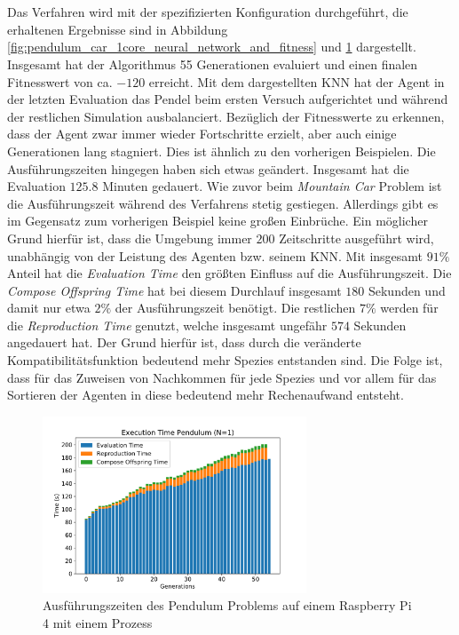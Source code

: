 \\\\
Das Verfahren wird mit der spezifizierten Konfiguration durchgeführt, die erhaltenen Ergebnisse sind in Abbildung \ref{fig:pendulum_car_1core_neural_network_and_fitness} und \ref{fig:pendulum_1core_1pi_time} dargestellt. Insgesamt hat der Algorithmus 55 Generationen evaluiert und einen finalen Fitnesswert von ca. $-120$ erreicht. Mit dem dargestellten \ac{KNN} hat der Agent in der letzten Evaluation das Pendel beim ersten Versuch aufgerichtet und während der restlichen Simulation ausbalanciert. Bezüglich der Fitnesswerte zu erkennen, dass der Agent zwar immer wieder Fortschritte erzielt, aber auch einige Generationen lang stagniert. Dies ist ähnlich zu den vorherigen Beispielen. Die Ausführungszeiten hingegen haben sich etwas geändert. Insgesamt hat die Evaluation $125.8$ Minuten gedauert. Wie zuvor beim \emph{Mountain Car} Problem ist die Ausführungszeit während des Verfahrens stetig gestiegen. Allerdings gibt es im Gegensatz zum vorherigen Beispiel keine großen Einbrüche. Ein möglicher Grund hierfür ist, dass die Umgebung immer $200$ Zeitschritte ausgeführt wird, unabhängig von der Leistung des Agenten bzw. seinem \ac{KNN}. Mit insgesamt $91\%$ Anteil hat die \emph{Evaluation Time} den größten Einfluss auf die Ausführungszeit. Die \emph{Compose Offspring Time} hat bei diesem Durchlauf insgesamt $180$ Sekunden und damit nur etwa $2\%$ der Ausführungszeit benötigt. Die restlichen $7\%$ werden für die \emph{Reproduction Time} genutzt, welche insgesamt ungefähr $574$ Sekunden angedauert hat. Der Grund hierfür ist, dass durch die veränderte Kompatibilitätsfunktion bedeutend mehr Spezies entstanden sind. Die Folge ist, dass für das Zuweisen von Nachkommen für jede Spezies und vor allem für das Sortieren der Agenten in diese bedeutend mehr Rechenaufwand entsteht. 

\begin{figure}[!h]
	\centering
	\includegraphics[width=0.7\textwidth]{./img/pendulum_single_core/pendulum_1_1core_1pi_time.pdf} 
	\caption{Ausführungszeiten des Pendulum Problems auf einem Raspberry Pi 4 mit einem Prozess}
	\label{fig:pendulum_1core_1pi_time}
\end{figure}


